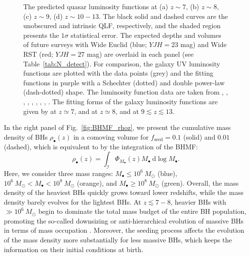 \documentclass[twocolumn, twocolappendix]{aastex63}
\newcommand{\Msun}{M_\odot}
\newcommand{\Mbh}{M_\bullet}
\newcommand{\fseed}{f_\mathrm{seed}}
\newcommand{\D}{\mathrm{d}}
\begin{document}
\begin{CJK*}{UTF8}{gbsn}
\begin{figure}
\caption{
The predicted quasar luminosity functions at (a) $z\sim 7$, (b) $z\sim 8$, (c) $z\sim 9$, (d) $z\sim 10-13$.
The black solid and dashed curves are the unobscured and intrinsic QLF, respectively, and the shaded region presents the $1\sigma$ statistical error.
The expected depths and volumes of future surveys with Wide Euclid (blue; $YJH=23$ mag) and Wide RST (red; $YJH=27$ mag) are overlaid in each panel (see Table~\ref{tab:N_detect}).
For comparison, the galaxy UV luminosity functions are plotted with the data points (grey) and the fitting functions in purple with a Schechter (dotted) and double power-law (dash-dotted) shape.
The luminosity function data are taken from \citet{2013MNRAS.432.2696M}, \citet{2016ApJ...819..129O}, \citet{2018ApJ...867..150M},
\citet{2019ApJ...883...99S}, \citet{2020MNRAS.493.2059B}, \citet{2021AJ....162...47B},
\citet{2022ApJS..259...20H,Harikane_2022b,Harikane_2022c}, \citet{2022arXiv220712356D}, \citet{2022arXiv220709434N}.
The fitting forms of the galaxy luminosity functions are given by \citet{2022ApJS..259...20H} at $z\simeq 7$, 
\citet{2020MNRAS.493.2059B} and \citet{2013MNRAS.432.2696M} at $z\simeq 8$, and \citet{Harikane_2022c} at $9\lesssim z\lesssim 13$.}
\label{fig:LFs}
\vspace{5mm}
\end{figure}



In the right panel of Fig.~\ref{fig:BHMF_rhoz}, we present the cumulative mass density of BHs $\rho_\bullet(z)$ in a comoving volume
for $\fseed=0.1$ (solid) and $0.01$ (dashed),
which is equivalent to by the integration of the BHMF:
%
\begin{equation}
 \rho_\bullet(z)=\int_{\mathcal{I}} \Phi_{\Mbh} (z) \Mbh ~\D \log \Mbh.
\end{equation}
%
Here, we consider three mass ranges: $M_\bullet \leq 10^6~\Msun$ (blue), $10^6~\Msun < M_\bullet < 10^8~\Msun$ (orange),
and $M_\bullet \geq 10^8~\Msun$ (green).
Overall, the mass density of the heaviest BHs quickly grows toward lower redshifts,
while the mass density barely evolves for the lightest BHs.
At $z\lesssim 7-8$, heavier BHs with $\gg 10^6~\Msun$ begin to dominate the total mass budget of the entire BH population,
promoting the so-called downsizing or anti-hierarchical evolution of massive BHs 
in terms of mass occupation \citep[e.g.,][]{2014ApJ...786..104U}.
Moreover, the seeding process affects the evolution of the mass density more substantially for less massive BHs,
which keeps the information on their initial conditions at birth.




\end{CJK*}
\end{document}

